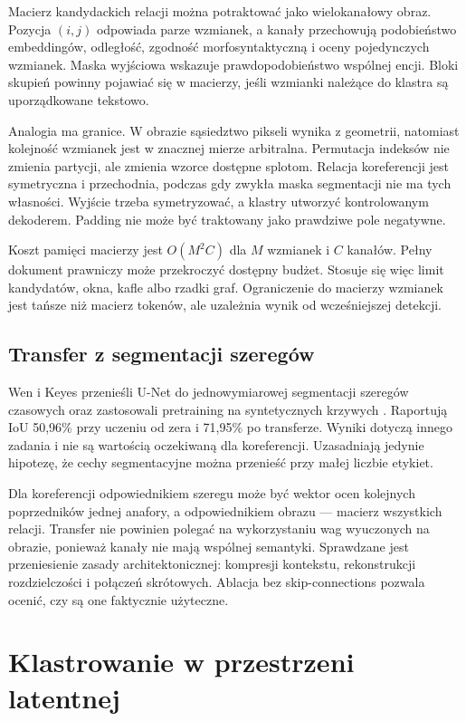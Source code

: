Macierz kandydackich relacji można potraktować jako wielokanałowy obraz. Pozycja $(i,j)$ odpowiada parze wzmianek, a kanały przechowują podobieństwo embeddingów, odległość, zgodność morfosyntaktyczną i oceny pojedynczych wzmianek. Maska wyjściowa wskazuje prawdopodobieństwo wspólnej encji. Bloki skupień powinny pojawiać się w macierzy, jeśli wzmianki należące do klastra są uporządkowane tekstowo.

Analogia ma granice. W obrazie sąsiedztwo pikseli wynika z geometrii, natomiast kolejność wzmianek jest w znacznej mierze arbitralna. Permutacja indeksów nie zmienia partycji, ale zmienia wzorce dostępne splotom. Relacja koreferencji jest symetryczna i przechodnia, podczas gdy zwykła maska segmentacji nie ma tych własności. Wyjście trzeba symetryzować, a klastry utworzyć kontrolowanym dekoderem. Padding nie może być traktowany jako prawdziwe pole negatywne.

Koszt pamięci macierzy jest $O(M^2C)$ dla $M$ wzmianek i $C$ kanałów. Pełny dokument prawniczy może przekroczyć dostępny budżet. Stosuje się więc limit kandydatów, okna, kafle albo rzadki graf. Ograniczenie do macierzy wzmianek jest tańsze niż macierz tokenów, ale uzależnia wynik od wcześniejszej detekcji.

\subsection{Transfer z segmentacji szeregów}

Wen i Keyes przenieśli U-Net do jednowymiarowej segmentacji szeregów czasowych oraz zastosowali pretraining na syntetycznych krzywych \cite{wen_2019_time}. Raportują IoU 50,96\% przy uczeniu od zera i 71,95\% po transferze. Wyniki dotyczą innego zadania i nie są wartością oczekiwaną dla koreferencji. Uzasadniają jedynie hipotezę, że cechy segmentacyjne można przenieść przy małej liczbie etykiet.

Dla koreferencji odpowiednikiem szeregu może być wektor ocen kolejnych poprzedników jednej anafory, a odpowiednikiem obrazu --- macierz wszystkich relacji. Transfer nie powinien polegać na wykorzystaniu wag wyuczonych na obrazie, ponieważ kanały nie mają wspólnej semantyki. Sprawdzane jest przeniesienie zasady architektonicznej: kompresji kontekstu, rekonstrukcji rozdzielczości i połączeń skrótowych. Ablacja bez skip-connections pozwala ocenić, czy są one faktycznie użyteczne.

\section{Klastrowanie w przestrzeni latentnej}
\label{sec:klastrowanie-latentne}

